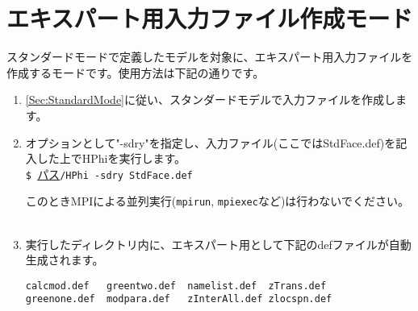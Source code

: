 \section{エキスパート用入力ファイル作成モード}
スタンダードモードで定義したモデルを対象に、エキスパート用入力ファイルを作成するモードです。使用方法は下記の通りです。
\begin{enumerate}
\item{\ref{Sec:StandardMode}に従い、スタンダードモデルで入力ファイルを作成します。}
\item{オプションとして"-sdry"を指定し、入力ファイル(ここではStdFace.def)を記入した上でHPhiを実行します。}\\
\verb|$ |\underline{パス}\verb|/HPhi -sdry StdFace.def|

このときMPIによる並列実行(\verb|mpirun|, \verb|mpiexec|など)は行わないでください。
~\\
\item{実行したディレクトリ内に、エキスパート用として下記のdefファイルが自動生成されます。}\\
\begin{minipage}{12cm}
\begin{screen}
\begin{verbatim}
calcmod.def   greentwo.def  namelist.def  zTrans.def
greenone.def  modpara.def   zInterAll.def zlocspn.def
\end{verbatim}
\end{screen}
\end{minipage}
\end{enumerate}